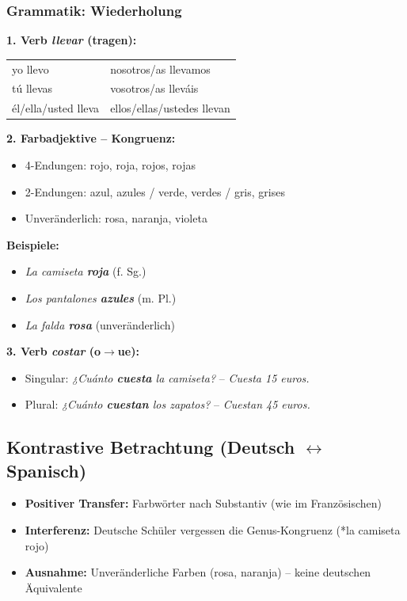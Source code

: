 \documentclass[11pt,a4paper]{article}
\begin{document}
\subsubsection{Grammatik: Wiederholung}

\textbf{1. Verb \textit{llevar} (tragen):}
\begin{center}
\begin{tabular}{ll}
yo llevo & nosotros/as llevamos \\
tú llevas & vosotros/as lleváis \\
él/ella/usted lleva & ellos/ellas/ustedes llevan \\
\end{tabular}
\end{center}

\textbf{2. Farbadjektive -- Kongruenz:}
\begin{itemize}
    \item 4-Endungen: rojo, roja, rojos, rojas
    \item 2-Endungen: azul, azules / verde, verdes / gris, grises
    \item Unveränderlich: rosa, naranja, violeta
\end{itemize}

\textbf{Beispiele:}
\begin{itemize}
    \item \textit{La camiseta \textbf{roja}} (f. Sg.)
    \item \textit{Los pantalones \textbf{azules}} (m. Pl.)
    \item \textit{La falda \textbf{rosa}} (unveränderlich)
\end{itemize}

\textbf{3. Verb \textit{costar} (o$\rightarrow$ue):}
\begin{itemize}
    \item Singular: \textit{¿Cuánto \textbf{cuesta} la camiseta?} -- \textit{Cuesta 15 euros.}
    \item Plural: \textit{¿Cuánto \textbf{cuestan} los zapatos?} -- \textit{Cuestan 45 euros.}
\end{itemize}

\subsection{Kontrastive Betrachtung (Deutsch $\leftrightarrow$ Spanisch)}
\begin{itemize}
    \item \textbf{Positiver Transfer:} Farbwörter nach Substantiv (wie im Französischen)
    \item \textbf{Interferenz:} Deutsche Schüler vergessen die Genus-Kongruenz (*la camiseta rojo)
    \item \textbf{Ausnahme:} Unveränderliche Farben (rosa, naranja) -- keine deutschen Äquivalente
\end{itemize}
\end{document}
